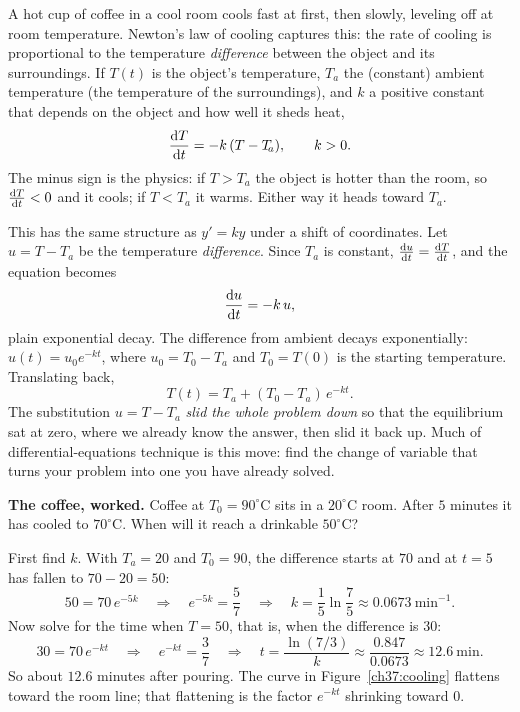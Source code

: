 A hot cup of coffee in a cool room cools fast at first, then slowly, leveling off at
room temperature. Newton's law of cooling captures this: the rate of cooling is
proportional to the temperature \emph{difference} between the object and its
surroundings. If $T(t)$ is the object's temperature, $T_{\!a}$ the (constant)
ambient temperature (the temperature of the surroundings), and $k$ a positive
constant that depends on the object and how well it sheds heat,
\[
  \frac{\mathrm{d} T}{\mathrm{d} t} = -k\,(T - T_{\!a}), \qquad k>0.
\]
The minus sign is the physics: if $T>T_{\!a}$ the object is hotter than the room, so
$\frac{\mathrm{d} T}{\mathrm{d} t}<0$ and it cools; if $T<T_{\!a}$ it warms. Either way it heads toward
$T_{\!a}$.

\begin{whybox}
This has the same structure as $y'=ky$ under a shift of coordinates. Let $u = T - T_{\!a}$ be the temperature \emph{difference}. Since $T_{\!a}$
is constant, $\frac{\mathrm{d} u}{\mathrm{d} t} = \frac{\mathrm{d} T}{\mathrm{d} t}$, and the equation becomes
\[
  \frac{\mathrm{d} u}{\mathrm{d} t} = -k\,u,
\]
plain exponential decay. The difference from ambient decays exponentially:
$u(t)=u_0 e^{-kt}$, where $u_0=T_0-T_{\!a}$ and $T_0=T(0)$ is the starting
temperature. Translating back,
\[
  T(t) = T_{\!a} + (T_0 - T_{\!a})\,e^{-kt}.
\]
The substitution $u=T-T_{\!a}$ \emph{slid the whole problem down} so that the
equilibrium sat at zero, where we already know the answer, then slid it back up.
Much of differential-equations technique is this move: find the change of
variable that turns your problem into one you have already solved.
\end{whybox}

\begin{applicationbox}
\textbf{The coffee, worked.} Coffee at $T_0 = 90^\circ$C sits in a $20^\circ$C room.
After $5$ minutes it has cooled to $70^\circ$C. When will it reach a drinkable
$50^\circ$C?

First find $k$. With $T_{\!a}=20$ and $T_0=90$, the difference starts at $70$ and at
$t=5$ has fallen to $70-20=50$:
\[
  50 = 70\,e^{-5k}
  \quad\Longrightarrow\quad e^{-5k}=\frac{5}{7}
  \quad\Longrightarrow\quad k = \frac{1}{5}\ln\frac{7}{5}\approx 0.0673\ \text{min}^{-1}.
\]
Now solve for the time when $T=50$, that is, when the difference is $30$:
\[
  30 = 70\,e^{-kt}
  \quad\Longrightarrow\quad e^{-kt}=\frac{3}{7}
  \quad\Longrightarrow\quad t = \frac{\ln(7/3)}{k}\approx \frac{0.847}{0.0673}\approx 12.6\ \text{min}.
\]
So about $12.6$ minutes after pouring. The curve in Figure~\ref{ch37:cooling}
flattens toward the room line; that flattening is the factor $e^{-kt}$ shrinking
toward $0$.
\end{applicationbox}

